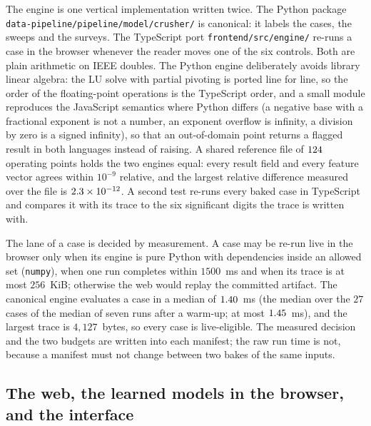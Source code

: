 The engine is one vertical implementation written twice. The Python package \texttt{data-pipeline/\allowbreak{}pipeline/\allowbreak{}model/\allowbreak{}crusher/\allowbreak{}} is
canonical: it labels the cases, the sweeps and the surveys. The TypeScript port \texttt{frontend/\allowbreak{}src/\allowbreak{}engine/\allowbreak{}} re-runs a case in the
browser whenever the reader moves one of the six controls. Both are plain arithmetic on IEEE doubles. The Python engine
deliberately avoids library linear algebra: the LU solve with partial pivoting is ported line for line, so the order of the
floating-point operations is the TypeScript order, and a small module reproduces the JavaScript semantics where Python differs (a
negative base with a fractional exponent is not a number, an exponent overflow is infinity, a division by zero is a signed
infinity), so that an out-of-domain point returns a flagged result in both languages instead of raising. A shared reference file
of $124$ operating points holds the two engines equal: every result field and every feature vector agrees within $10^{-9}$
relative, and the largest relative difference measured over the file is $2.3\times10^{-12}$. A second test re-runs every baked
case in TypeScript and compares it with its trace to the six significant digits the trace is written with.

The lane of a case is decided by measurement. A case may be re-run live in the browser only when its engine is pure Python with
dependencies inside an allowed set (\texttt{numpy}), when one run completes within $1500$~ms and when its trace is at most
$256$~KiB; otherwise the web would replay the committed artifact. The canonical engine evaluates a case in a median of $1.40$~ms
(the median over the $27$ cases of the median of seven runs after a warm-up; at most $1.45$~ms), and the largest trace is $4{,}127$~bytes,
so every case is live-eligible. The measured decision and the two budgets are written into each manifest; the raw run time is not,
because a manifest must not change between two bakes of the same inputs.

\subsection{The web, the learned models in the browser, and the interface}\label{sec:arch-web}

